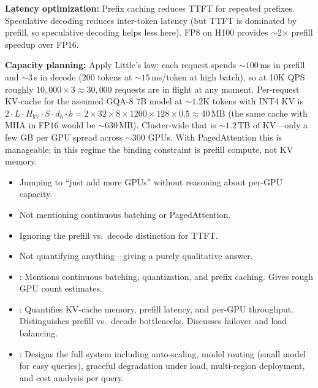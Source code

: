 \begin{interviewq}
\textbf{Latency optimization:}  Prefix caching reduces TTFT for repeated prefixes.
Speculative decoding reduces inter-token latency (but TTFT is dominated by prefill,
so speculative decoding helps less here).  FP8 on H100 provides $\sim$2$\times$
prefill speedup over FP16.

\textbf{Capacity planning:}  Apply Little's law: each request spends ${\sim}100$\,ms in
prefill and ${\sim}3$\,s in decode (200 tokens at ${\sim}15$\,ms/token at high batch),
so at 10K QPS roughly $10{,}000 \times 3 \approx 30{,}000$ requests are in flight at any
moment.  Per-request KV-cache for the assumed GQA-8 7B model at ${\sim}1.2$K tokens with
INT4 KV is $2 \cdot L \cdot H_{\text{kv}} \cdot S \cdot d_h \cdot b = 2 \times 32 \times
8 \times 1200 \times 128 \times 0.5 \approx 40$\,MB (the same cache with MHA in FP16
would be ${\sim}630$\,MB).  Cluster-wide that is ${\sim}1.2$\,TB of KV---only a few GB
per GPU spread across ${\sim}300$ GPUs.  With PagedAttention this is manageable; in this
regime the binding constraint is prefill compute, not KV memory.

\redflags
\begin{itemize}
    \item Jumping to ``just add more GPUs'' without reasoning about per-GPU capacity.
    \item Not mentioning continuous batching or PagedAttention.
    \item Ignoring the prefill vs.\ decode distinction for TTFT.
    \item Not quantifying anything---giving a purely qualitative answer.
\end{itemize}


\goodgreat
\begin{itemize}
    \item {}: Mentions continuous batching, quantization, and prefix
          caching.  Gives rough GPU count estimates.
    \item {}: Quantifies KV-cache memory, prefill latency, and per-GPU
          throughput.  Distinguishes prefill vs.\ decode bottlenecks.  Discusses
          failover and load balancing.
    \item {}: Designs the full system including auto-scaling, model
          routing (small model for easy queries), graceful degradation under load,
          multi-region deployment, and cost analysis per query.
\end{itemize}

\end{interviewq}

